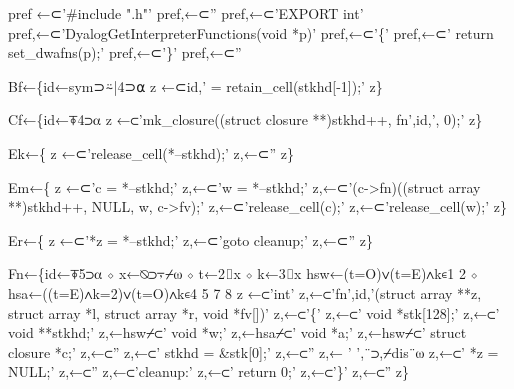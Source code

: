 \documentclass{article}%
\begin{document}
\nwenddocs{}\endmoddef\nwstartdeflinemarkup{}\nwenddeflinemarkup
pref ←⊂'#include ".h"'
pref,←⊂''
pref,←⊂'EXPORT int'
pref,←⊂'DyalogGetInterpreterFunctions(void *p)'
pref,←⊂'\{'
pref,←⊂'    return set_dwafns(p);'
pref,←⊂'\}'
pref,←⊂''
\nwendcode{}\nwdocspar

\nwenddocs{}\endmoddef\nwstartdeflinemarkup{}\nwenddeflinemarkup
Bf←\{id←sym⊃⍨|4⊃⍺
        z ←⊂id,' = retain_cell(stkhd[-1]);'
z\}

Cf←\{id←⍕4⊃⍺
        z ←⊂'mk_closure((struct closure **)stkhd++, fn',id,', 0);'
z\}

Ek←\{
        z ←⊂'release_cell(*--stkhd);'
        z,←⊂''
z\}

Em←\{
        z ←⊂'c = *--stkhd;'
        z,←⊂'w = *--stkhd;'
        z,←⊂'(c->fn)((struct array **)stkhd++, NULL, w, c->fv);'
        z,←⊂'release_cell(c);'
        z,←⊂'release_cell(w);'
z\}

Er←\{
        z ←⊂'*z = *--stkhd;'
        z,←⊂'goto cleanup;'
        z,←⊂''
z\}

Fn←\{id←⍕5⊃⍺ ⋄ x←⍉⊃⍪⌿⍵ ⋄ t←2⌷x ⋄ k←3⌷x
        hsw←(t=O)∨(t=E)∧k∊1 2 ⋄ hsa←((t=E)∧k=2)∨(t=O)∧k∊4 5 7 8
        z ←⊂'int'
        z,←⊂'fn',id,'(struct array **z, struct array *l, struct array *r, void *fv[])'
        z,←⊂'\{'
        z,←⊂'       void    *stk[128];'
        z,←⊂'       void    **stkhd;'
        z,←hsw⌿⊂' void    *w;'
        z,←hsa⌿⊂' void    *a;'
        z,←hsw⌿⊂' struct  closure *c;'
        z,←⊂''
        z,←⊂'       stkhd = &stk[0];'
        z,←⊂''
        z,← ' ',¨⊃,⌿dis¨⍵
        z,←⊂'       *z = NULL;'
        z,←⊂''
        z,←⊂'cleanup:'
        z,←⊂'       return 0;'
        z,←⊂'\}'
        z,←⊂''
z\}
\end{document}
